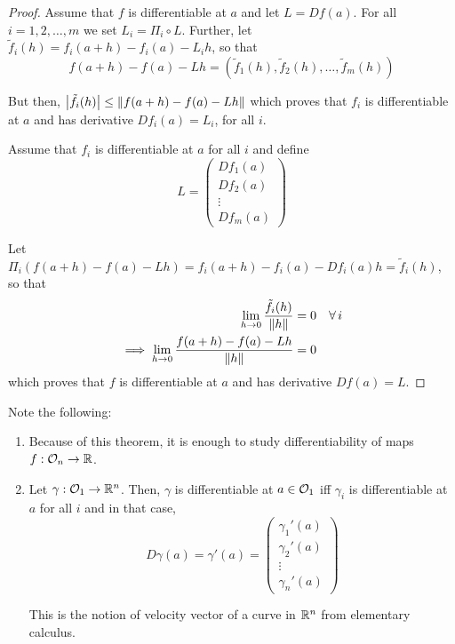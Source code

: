 \documentclass[../Analysis-3.tex]{subfiles}
\begin{document}
\begin{proof}
  Assume that $ f $ is differentiable at $ a $ and let $ L = Df(a) $. For all $ i = 1,2,\dots,m $ we set $ L_i = \Pi_i \circ L $. Further, let $ \tilde{f}_i(h) = f_i(a+h)-f_i(a)-L_ih $, so that
  \[ f(a+h)-f(a)-Lh = (\tilde{f}_1(h), \tilde{f}_2(h), \dots, \tilde{f}_m(h)) \]

  But then, $ \abs{\tilde{f}_i(h)} \leq \norm{f(a+h)-f(a)-Lh} $ which proves that $ f_i $ is differentiable at $ a $ and has derivative $ Df_i(a) = L_i $, for all $ i $.
  \msk

  Assume that $ f_i $ is differentiable at $ a $ for all $ i $ and define
  \[ L =
    \begin{pmatrix}
      Df_1(a) \\
      Df_2(a) \\
      \vdots  \\
      Df_m(a)
    \end{pmatrix} \]

  Let $ \Pi_i(f(a+h)-f(a)-Lh) = f_i(a+h)-f_i(a)-Df_i(a)h =  \tilde{f}_i(h) $, so that
  \begin{align*}
    \lim_{h \to 0} \frac{\tilde{f}_i(h)}{\norm{h}}          & = 0 \quad \forall \, i \\
    \implies \lim_{h \to 0} \frac{f(a+h)-f(a)-Lh}{\norm{h}} & = 0
  \end{align*}
  which proves that $ f $ is differentiable at $ a $ and has derivative $ Df(a) = L $.
\end{proof}

Note the following:
\begin{enumerate}[label = $\bullet$]
  \item Because of this theorem, it is enough to study differentiability of maps $ f: \mathcal{O}_{n} \to \mathbb{R} $.
  \item Let $ \gamma: \mathcal{O}_{1} \to \mathbb{R}^n $. Then, $ \gamma $ is differentiable at $ a \in \mathcal{O}_{1} $ iff $ \gamma_i $ is differentiable at $ a $ for all $ i $ and in that case,
        \[ D\gamma(a) = \gamma'(a) =
          \begin{pmatrix}
            \gamma_1'(a) \\
            \gamma_2'(a) \\
            \vdots       \\
            \gamma_n'(a)
          \end{pmatrix} \]

        This is the notion of velocity vector of a curve in $ \mathbb{R}^n $ from elementary calculus.
\end{enumerate}
\end{document}
